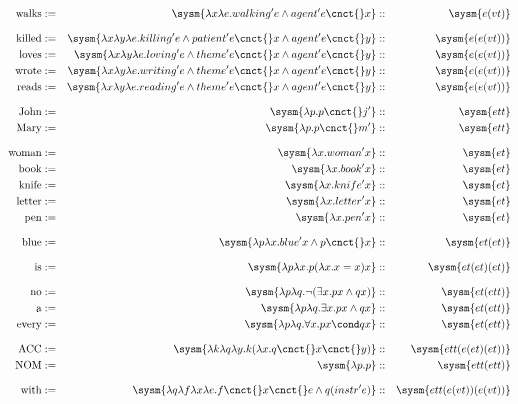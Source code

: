 \documentclass[10pt,a4paper]{exam}
\begin{document}
\begin{ulexicon}

\begin{align*}
	\text{walks}   &:=& \sysm{\lambda x\lambda e.walking'e \land agent'e\cnct{}x}  &::& \sysm{e(vt)}\\[8pt]
	\text{killed}  &:=& \sysm{\lambda x\lambda y\lambda e.killing' e \land patient'e\cnct{} x \land agent'e\cnct{} y}   &::& \sysm{e(e(vt))}\\
	\text{loves}   &:=& \sysm{\lambda x\lambda y\lambda e.loving' e \land theme'e\cnct{} x \land agent'e\cnct{} y}   &::& \sysm{e(e(vt))}\\
	\text{wrote}  &:=& \sysm{\lambda x\lambda y\lambda e.writing' e \land theme'e\cnct{} x \land agent'e\cnct{} y}   &::& \sysm{e(e(vt))}\\
	\text{reads}   &:=& \sysm{\lambda x\lambda y\lambda e.reading' e \land theme'e\cnct{} x \land agent'e\cnct{} y}   &::& \sysm{e(e(vt))}\\[8pt]
	\text{John}    &:=& \sysm{\lambda p.p\cnct{}j'}                      &::& \sysm{ett}\\
	\text{Mary}    &:=& \sysm{\lambda p.p\cnct{}m'}                      &::& \sysm{ett}\\[8pt]
	\text{woman}   &:=& \sysm{\lambda x.woman'x}                         &::& \sysm{et}\\
	\text{book}    &:=& \sysm{\lambda x.book'x}                          &::& \sysm{et}\\
	\text{knife}   &:=& \sysm{\lambda x.knife'x}                          &::& \sysm{et}\\
	\text{letter}   &:=& \sysm{\lambda x.letter'x}                          &::& \sysm{et}\\
	\text{pen}   &:=& \sysm{\lambda x.pen'x}                          &::& \sysm{et}\\[8pt]
	\text{blue}    &:=& \sysm{\lambda p\lambda x.blue'x\land p\cnct{}x}  &::& \sysm{et(et)}\\[8pt]
	\text{is}      &:=& \sysm{\lambda p\lambda x.p (\lambda x.x=x) x}    &::& \sysm{et(et)(et)}\\[8pt]
	\text{no}      &:=& \sysm{\lambda p\lambda q.\neg(\exists x. px \land qx)} &::& \sysm{et(ett)}\\
	\text{a}       &:=& \sysm{\lambda p\lambda q.\exists x. px \land qx} &::& \sysm{et(ett)}\\
	\text{every}   &:=& \sysm{\lambda p\lambda q.\forall x. px \cond qx} &::& \sysm{et(ett)}\\[8pt]
	\text{ACC}     &:=& \sysm{\lambda k \lambda q \lambda y.k (\lambda x.q\cnct{} x\cnct{} y)} &::& \sysm{ett(e(et)(et))}\\
	\text{NOM}     &:=& \sysm{\lambda p.p} &::& \sysm{ett(ett)}\\[8pt]
	\text{with}     &:=& \sysm{\lambda q\lambda f\lambda x\lambda e . f\cnct{}x\cnct{}e \land q (instr' e)} &::& \sysm{ett(e(vt))(e(vt))}\\
\end{align*}

\end{ulexicon}
\end{document}

